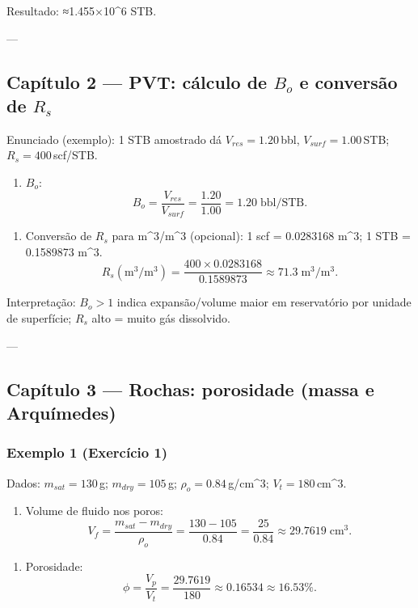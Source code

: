 \documentclass[11pt,a4paper]{article}
\begin{document}
Resultado: ≈1.455×10^6 STB.

---

\subsection{Capítulo 2 — PVT: cálculo de $B_o$ e conversão de $R_s$}
Enunciado (exemplo): 1 STB amostrado dá $V_{res}=1.20\,$bbl, $V_{surf}=1.00\,$STB; $R_s=400\,$scf/STB.

\begin{enumerate}
\item $B_o$:
$$B_o=\dfrac{V_{res}}{V_{surf}}=\dfrac{1.20}{1.00}=1.20\;\text{bbl/STB}.$$ 
\end{enumerate}

\begin{enumerate}
\item Conversão de $R_s$ para m^3/m^3 (opcional):
1 scf = 0.0283168 m^3; 1 STB = 0.1589873 m^3.
$$R_s(\mathrm{m}^3/\mathrm{m}^3)=\dfrac{400\times0.0283168}{0.1589873}\approx71.3\;\mathrm{m}^3/\mathrm{m}^3.$$ 
\end{enumerate}

Interpretação: $B_o>1$ indica expansão/volume maior em reservatório por unidade de superfície; $R_s$ alto = muito gás dissolvido.

---

\subsection{Capítulo 3 — Rochas: porosidade (massa e Arquímedes)}

\subsubsection{Exemplo 1 (Exercício 1)}
Dados: $m_{sat}=130\,$g; $m_{dry}=105\,$g; $\rho_o=0.84\,$g/cm^3; $V_t=180\,$cm^3.

\begin{enumerate}
\item Volume de fluido nos poros:
$$V_f=\dfrac{m_{sat}-m_{dry}}{\rho_o}=\dfrac{130-105}{0.84}=\dfrac{25}{0.84}\approx29.7619\;\text{cm}^3.$$ 
\end{enumerate}

\begin{enumerate}
\item Porosidade:
$$\phi=\dfrac{V_p}{V_t}=\dfrac{29.7619}{180}\approx0.16534\approx16.53\%.$$ 
\end{enumerate}
\end{document}
